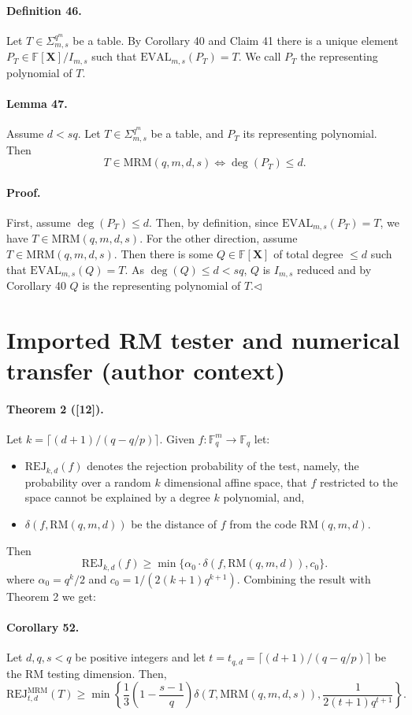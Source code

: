 \documentclass[10pt,a4paper]{article}
\begin{document}
\paragraph{Definition 46.} Let $T\in\Sigma_{m,s}^{q^m}$ be a table. By Corollary 40 and Claim 41 there is a unique element $P_T\in\mathbb F[\boldsymbol X]/I_{m,s}$ such that $\mathrm{EVAL}_{m,s}(P_T)=T$. We call $P_T$ the representing polynomial of $T$.
\paragraph{Lemma 47.} Assume $d<sq$. Let $T\in\Sigma_{m,s}^{q^m}$ be a table, and $P_T$ its representing polynomial. Then
\[T\in\mathrm{MRM}(q,m,d,s)\Longleftrightarrow\deg(P_T)\leq d.\]
\paragraph{Proof.} First, assume $\deg(P_T)\leq d$. Then, by definition, since $\mathrm{EVAL}_{m,s}(P_T)=T$, we have $T\in\mathrm{MRM}(q,m,d,s)$. For the other direction, assume $T\in\mathrm{MRM}(q,m,d,s)$. Then there is some $Q\in\mathbb F[\boldsymbol X]$ of total degree $\leq d$ such that $\mathrm{EVAL}_{m,s}(Q)=T$. As $\deg(Q)\leq d<sq$, $Q$ is $I_{m,s}$ reduced and by Corollary 40 $Q$ is the representing polynomial of $T$.\hfill$\triangleleft$
\section*{Imported RM tester and numerical transfer (author context)}
\paragraph{Theorem 2 ([12]).} Let $k=\lceil(d+1)/(q-q/p)\rceil$. Given $f:\mathbb F_q^m\to\mathbb F_q$ let:
\begin{itemize}
\item $\mathrm{REJ}_{k,d}(f)$ denotes the rejection probability of the test, namely, the probability over a random $k$ dimensional affine space, that $f$ restricted to the space cannot be explained by a degree $k$ polynomial, and,
\item $\delta(f,\mathrm{RM}(q,m,d))$ be the distance of $f$ from the code $\mathrm{RM}(q,m,d)$.
\end{itemize}
Then
\[\mathrm{REJ}_{k,d}(f)\geq\min\{\alpha_0\cdot\delta(f,\mathrm{RM}(q,m,d)),c_0\}.\]
where $\alpha_0=q^k/2$ and $c_0=1/(2(k+1)q^{k+1})$.
Combining the result with Theorem 2 we get:
\paragraph{Corollary 52.} Let $d,q,s<q$ be positive integers and let $t=t_{q,d}=\lceil(d+1)/(q-q/p)\rceil$ be the RM testing dimension. Then,
\[\mathrm{REJ}_{t,d}^{\mathrm{MRM}}(T)\geq\min\left\{\frac13\left(1-\frac{s-1}q\right)\delta(T,\mathrm{MRM}(q,m,d,s)),\frac1{2(t+1)q^{t+1}}\right\}.\]
\end{document}
